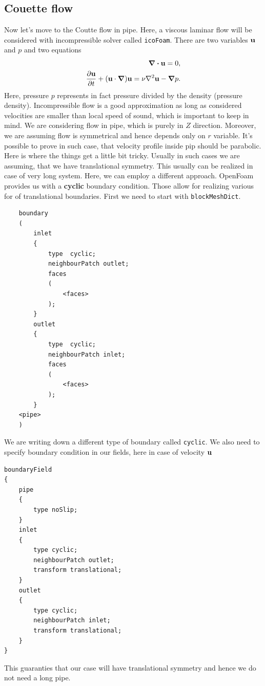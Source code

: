 \documentclass{article}
\begin{document}
\subsection{Couette flow}
Now let's move to the Coutte flow in pipe. Here, a viscous laminar flow will be considered with incompressible solver called \texttt{icoFoam}.
There are two variables $\vb{u}$ and $p$ and two equations
\begin{align}
    \div{\vb{u}} = 0,\\
    \pdv{\vb{u}}{t} + (\vb{u}\cdot \grad)\vb{u} = \nu \laplacian{\vb{u}} -\grad{p}.\\
\end{align}
Here, pressure $p$ represents in fact pressure divided by the density (pressure density). Incompressible flow is a good approximation as long as considered velocities are smaller than local speed of 
sound, which is important to keep in mind. We are considering flow in pipe, which is purely in $Z$ direction. Moreover, we are assuming flow is symmetrical and hence depends only on 
$r$ variable. It's possible to prove in such case, that velocity profile inside pip should be parabolic.
Here is where the things get a little bit tricky. Usually in such cases we are assuming, that we have translational symmetry. This usually can be realized in case of very long system.
Here, we can employ a different approach. OpenFoam provides us with a \textbf{cyclic} boundary condition. Those allow for realizing various for of translational boundaries.
First we need to start with \texttt{blockMeshDict}.
\begin{verbatim}
    boundary
    (
        inlet
        {
            type  cyclic;
            neighbourPatch outlet; 
            faces
            (
                <faces>
            );
        }
        outlet
        {
            type  cyclic;
            neighbourPatch inlet; 
            faces
            (
                <faces>
            );
        }
    <pipe>
    )        
\end{verbatim}
We are writing down a different type of boundary called \texttt{cyclic}. We also need to specify boundary condition in our fields, here in case of velocity 
$\vb{u}$
\begin{verbatim}
boundaryField
{
    pipe
    {
        type noSlip;
    }
    inlet
    {
        type cyclic;
        neighbourPatch outlet;
        transform translational;
    }
    outlet
    {
        type cyclic;
        neighbourPatch inlet;
        transform translational;
    }
}
\end{verbatim}
This guaranties that our case will have translational symmetry and hence we do not need a long pipe. 
\end{document}
